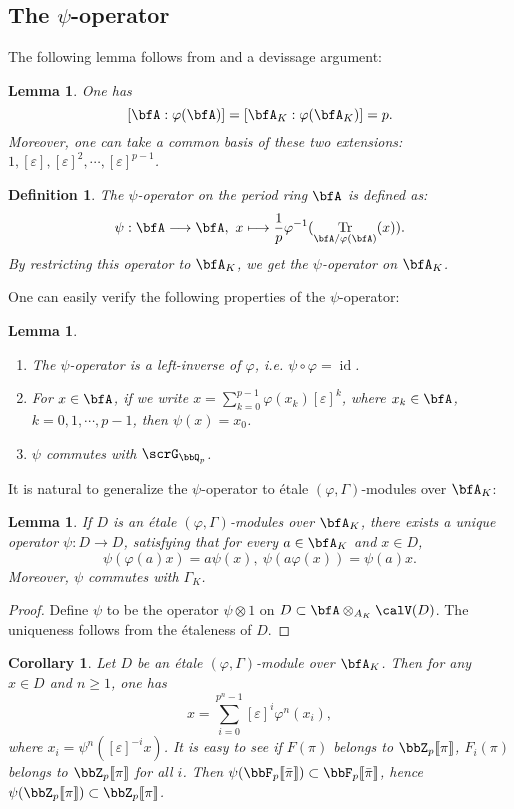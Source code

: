\documentclass[a4paper,oneside]{amsart}
\let\opn\operatorname
\DeclareMathOperator{\Tr}{Tr}
\newcommand{\lto}{\longrightarrow}
\newcommand{\id}{\opn{id}}
\newtheorem{lemma}[theorem]{Lemma}
\newtheorem{definition}[theorem]{Definition}
\newtheorem{corollary}[theorem]{Corollary}
\numberwithin{equation}{section}
\begin{document}
\subsection{The $\psi$-operator}
The following lemma follows from \cite[Theorem 29.2]{matsumura_commutative_1987} and a devissage argument:
\begin{lemma}
    One has
    $$[\bfA:\varphi(\bfA)]=[\bfA_K:\varphi(\bfA_K)]=p.$$
    Moreover, one can take a common basis of these two extensions:
    $1,[\varepsilon],[\varepsilon]^2,\cdots,[\varepsilon]^{p-1}$.
\end{lemma}
\begin{definition}
    The $\psi$-operator on the period ring $\bfA$ is defined as:
    $$\psi:\bfA\lto\bfA,\ x\longmapsto \frac{1}{p}\varphi^{-1}(\Tr_{\bfA/\varphi(\bfA)}(x)).$$
    By restricting this operator to $\bfA_K$, we get the $\psi$-operator on $\bfA_K$.
\end{definition}
One can easily verify the following properties of the $\psi$-operator:
\begin{lemma}\leavevmode
    \begin{enumerate}
        \item The $\psi$-operator is a left-inverse of $\varphi$, i.e. $\psi\circ\varphi=\id$.
        \item For $x\in\bfA$, if we write $x=\sum_{k=0}^{p-1}\varphi(x_k)[\varepsilon]^k$, where $x_k\in\bfA$, $k=0,1,\cdots,p-1$, then $\psi(x)=x_0$.
        \item $\psi$ commutes with $\scrG_{\bbQ_p}$.
    \end{enumerate}
\end{lemma}

It is natural to generalize the $\psi$-operator to \'etale $(\varphi,\Gamma)$-modules over $\bfA_K$:
\begin{lemma}
    If $D$ is an \'etale $(\varphi,\Gamma)$-modules over $\bfA_K$, there exists a unique operator $\psi:D\lto D$, satisfying that for every $a\in\bfA_K$ and $x\in D$,
    $$\psi(\varphi(a)x)=a\psi(x),\ \psi(a\varphi(x))=\psi(a)x.$$ Moreover, $\psi$ commutes with $\Gamma_K$.
\end{lemma}
\begin{proof}
    Define $\psi$ to be the operator $\psi\otimes 1$ on $D\subset\bfA\otimes_{A_K}\calV(D)$.  The uniqueness follows from the \'etaleness of $D$.
\end{proof}

\begin{corollary}
    Let $D$ be an \'etale $(\varphi,\Gamma)$-module over $\bfA_K$. Then for any $x\in D$ and $n\geq 1$, one has
    $$x=\sum_{i=0}^{p^n-1}[\varepsilon]^i\varphi^n(x_i),$$
    where $x_i=\psi^n([\varepsilon]^{-i}x)$. It is easy to see if $F(\pi)$ belongs to $\bbZ_p\llbracket\pi\rrbracket$, $F_i(\pi)$ belongs to $\bbZ_p\llbracket\pi\rrbracket$ for all $i$. Then $\psi(\bbF_p\llbracket\bar{\pi}\rrbracket)\subset\bbF_p\llbracket\bar{\pi}\rrbracket$, hence $\psi(\bbZ_p\llbracket\pi\rrbracket)\subset\bbZ_p\llbracket\pi\rrbracket$.
\end{corollary}
\end{document}
